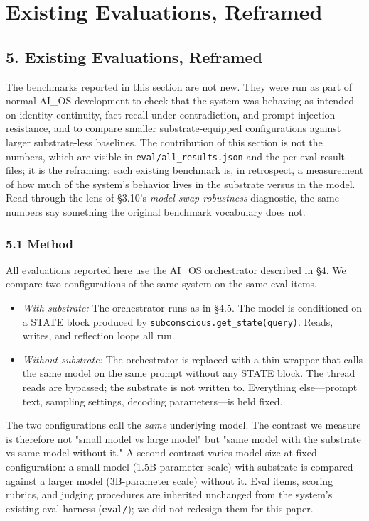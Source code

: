\documentclass[11pt,letterpaper]{article}
\begin{document}
\section{Existing Evaluations, Reframed}
\subsection*{5. Existing Evaluations, Reframed}

The benchmarks reported in this section are not new. They were run as part of normal AI\_OS development to check that the system was behaving as intended on identity continuity, fact recall under contradiction, and prompt-injection resistance, and to compare smaller substrate-equipped configurations against larger substrate-less baselines. The contribution of this section is not the numbers, which are visible in \texttt{eval/all\_results.json} and the per-eval result files; it is the reframing: each existing benchmark is, in retrospect, a measurement of how much of the system's behavior lives in the substrate versus in the model. Read through the lens of §3.10's \emph{model-swap robustness} diagnostic, the same numbers say something the original benchmark vocabulary does not.

\subsubsection*{5.1 Method}

All evaluations reported here use the AI\_OS orchestrator described in §4. We compare two configurations of the same system on the same eval items.

\begin{itemize}
  \item \emph{With substrate:} The orchestrator runs as in §4.5. The model is conditioned on a STATE block produced by \texttt{subconscious.get\_state(query)}. Reads, writes, and reflection loops all run.
  \item \emph{Without substrate:} The orchestrator is replaced with a thin wrapper that calls the same model on the same prompt without any STATE block. The thread reads are bypassed; the substrate is not written to. Everything else---prompt text, sampling settings, decoding parameters---is held fixed.
\end{itemize}

The two configurations call the \emph{same} underlying model. The contrast we measure is therefore not "small model vs large model" but "same model with the substrate vs same model without it." A second contrast varies model size at fixed configuration: a small model (1.5B-parameter scale) with substrate is compared against a larger model (3B-parameter scale) without it. Eval items, scoring rubrics, and judging procedures are inherited unchanged from the system's existing eval harness (\texttt{eval/}); we did not redesign them for this paper.
\end{document}
